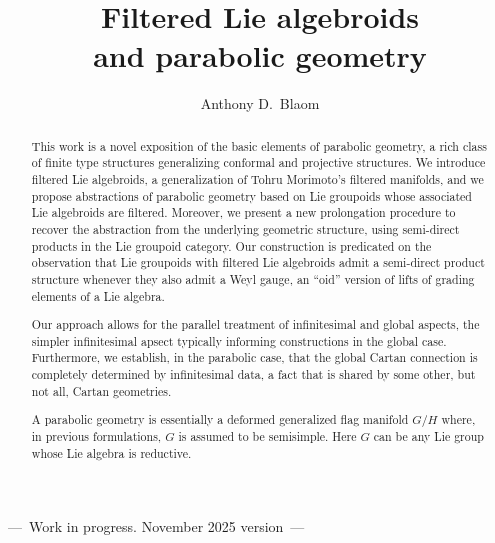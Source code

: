 \documentclass[leqno,12pt]{amsart} %
\newcommand\disclaimer{{\tiny\sffamily ---~Work in progress. November 2025 version~---}}
\begin{document}

%
\vspace{\baselineskip}
\title%
[\disclaimer]%
{Filtered Lie algebroids\\ and parabolic geometry}
\author{Anthony D.~Blaom}
\address{E-mail: {\tt anthony.blaom@gmail.com}}%
\thispagestyle{empty}
\begin{center}
  \disclaimer
  \vspace{\baselineskip}
\end{center}
\begin{abstract}
  This work is a novel exposition of the basic elements of parabolic geometry, a rich
  class of finite type structures generalizing conformal and projective structures. We
  introduce filtered Lie algebroids, a generalization of Tohru Morimoto's filtered
  manifolds, and we propose abstractions of parabolic geometry based on Lie groupoids
  whose associated Lie algebroids are filtered. Moreover, we present a new prolongation
  procedure to recover the abstraction from the underlying geometric structure, using
  semi-direct products in the Lie groupoid category. Our construction is predicated on the
  observation that Lie groupoids with filtered Lie algebroids admit a semi-direct product
  structure whenever they also admit a Weyl gauge, an ``oid'' version of lifts of grading
  elements of a Lie algebra.

  Our approach allows for the parallel treatment of infinitesimal and global aspects, the
  simpler infinitesimal apsect typically informing constructions in the global
  case. Furthermore, we establish, in the parabolic case, that the global Cartan
  connection is completely determined by infinitesimal data, a fact that is shared by some
  other, but not all, Cartan geometries.

  A parabolic geometry is essentially a deformed generalized flag manifold $G/H$ where, in
  previous formulations, $G$ is assumed to be semisimple. Here $G$ can be any Lie group
  whose Lie algebra is reductive.
\end{abstract}
\maketitle
\end{document}
